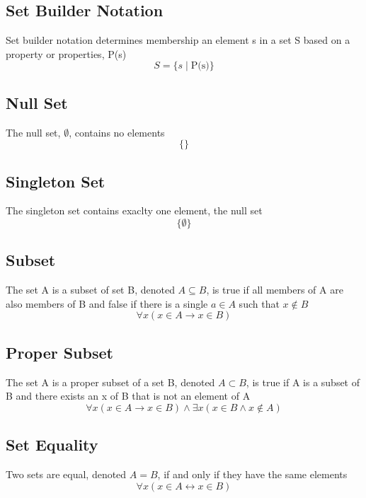 \documentclass[12pt]{article}
\begin{document}
\subsection{Set Builder Notation}
Set builder notation determines membership an element s in a set S based on a property or properties, P(s)
\begin{equation}
S = \{s\mid\text{P(s)}\}
\end{equation}

\subsection{Null Set}
The null set, $\emptyset$, contains no elements
\begin{equation}
\{ \}
\end{equation}

\subsection{Singleton Set}
The singleton set contains exaclty one element, the null set
\begin{equation}
\{ \emptyset\}
\end{equation}

\subsection{Subset}
The set A is a subset of set B, denoted $A \subseteq B$,
is true 
if all members of A are also members of B
and false 
if there is a single $a \in A$ such that $x \not \in B$
\begin{equation}
\forall x (x \in A \rightarrow x \in B)
\end{equation}

\subsection{Proper Subset}
The set A is a proper subset of a set B, denoted $A \subset B$,
is true 
if A is a subset of B 
and 
there exists an x of B that is not an element of A
\begin{equation}
\forall x (x \in A \rightarrow x \in B) \wedge \exists x (x \in B \wedge x \not \in A)
\end{equation}

\subsection{Set Equality}
Two sets are equal, denoted $A = B$,
if and only if
they have the same elements
\begin{equation}
\forall x(x \in A \leftrightarrow x \in B)
\end{equation}
\end{document}
